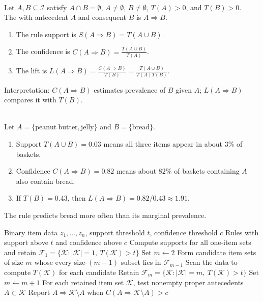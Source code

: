 \begin{definition} \label{def:sl-association-rule-confidence-lift} \\
Let $A,B\subseteq\mathcal{I}$ satisfy $A\cap B=\emptyset$, $A\neq\emptyset$, $B\neq\emptyset$, $T(A)>0$, and $T(B)>0$.\\
The  with antecedent $A$ and consequent $B$ is $A\Rightarrow B$.
\begin{enumerate}[label=(\roman*)]
\setlength{\itemsep}{0pt}
\item The rule support is $S(A\Rightarrow B)=T(A\cup B)$.
\item The confidence is $C(A\Rightarrow B)=\frac{T(A\cup B)}{T(A)}$.
\item The lift is $L(A\Rightarrow B)=\frac{C(A\Rightarrow B)}{T(B)}=\frac{T(A\cup B)}{T(A)T(B)}$.
\end{enumerate}
Interpretation: $C(A\Rightarrow B)$ estimates prevalence of $B$ given $A$; $L(A\Rightarrow B)$ compares it with $T(B)$.
\end{definition}

\begin{example} \label{ex:sl-market-basket-support-confidence-lift} \\
Let $A=\{\mathrm{peanut\ butter},\mathrm{jelly}\}$ and $B=\{\mathrm{bread}\}$.
\begin{enumerate}[label=(\roman*)]
\setlength{\itemsep}{0pt}
\item Support $T(A\cup B)=0.03$ means all three items appear in about $3\%$ of baskets.
\item Confidence $C(A\Rightarrow B)=0.82$ means about $82\%$ of baskets containing $A$ also contain bread.
\item If $T(B)=0.43$, then $L(A\Rightarrow B)=0.82/0.43\approx1.91$.
\end{enumerate}
The rule predicts bread more often than its marginal prevalence.
\end{example}

\begin{breakablealgorithm}
\caption{Apriori Association-Rule Search}
\label{alg:sl-apriori-association-rules}
\begin{algorithmic}
\Require Binary item data $z_1,\ldots,z_n$, support threshold $t$, confidence threshold $c$
\Ensure Rules with support above $t$ and confidence above $c$
\State Compute supports for all one-item sets and retain $\mathcal{F}_1=\{\mathcal{K}:|\mathcal{K}|=1,\ T(\mathcal{K})>t\}$
\State Set $m\gets2$
\State Form candidate item sets of size $m$ whose every size-$(m-1)$ subset lies in $\mathcal{F}_{m-1}$
\State Scan the data to compute $T(\mathcal{K})$ for each candidate
\State Retain $\mathcal{F}_m=\{\mathcal{K}:|\mathcal{K}|=m,\ T(\mathcal{K})>t\}$
\State Set $m\gets m+1$
\EndWhile
\State For each retained item set $\mathcal{K}$, test nonempty proper antecedents $A\subset\mathcal{K}$
\State Report $A\Rightarrow \mathcal{K}\setminus A$ when $C(A\Rightarrow \mathcal{K}\setminus A)>c$
\end{algorithmic}
\end{breakablealgorithm}

